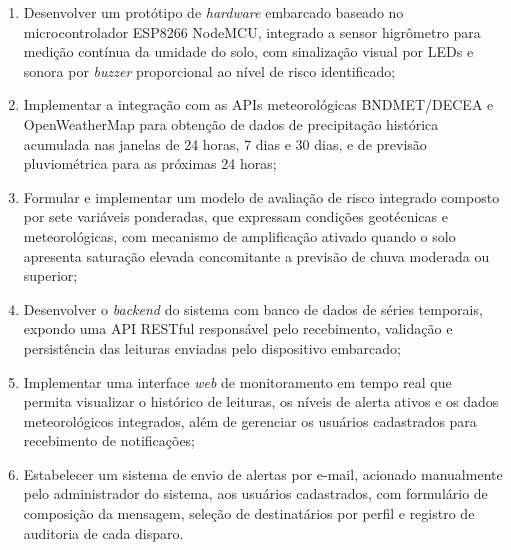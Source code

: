 \begin{enumerate}[label=\alph*)]

    \item Desenvolver um protótipo de \textit{hardware} embarcado
    baseado no microcontrolador ESP8266 NodeMCU, integrado a sensor
    higrômetro para medição contínua da umidade do solo, com
    sinalização visual por LEDs e sonora por \textit{buzzer}
    proporcional ao nível de risco identificado;

    \item Implementar a integração com as APIs meteorológicas
    BNDMET/DECEA e OpenWeatherMap para obtenção de dados de
    precipitação histórica acumulada nas janelas de 24 horas, 7 dias
    e 30 dias, e de previsão pluviométrica para as próximas 24 horas;

    \item Formular e implementar um modelo de avaliação de risco
    integrado composto por sete variáveis ponderadas, que expressam
    condições geotécnicas e meteorológicas, com mecanismo de
    amplificação ativado quando o solo apresenta saturação elevada
    concomitante a previsão de chuva moderada ou superior;

    \item Desenvolver o \textit{backend} do sistema com banco de dados
    de séries temporais, expondo uma API RESTful responsável pelo
    recebimento, validação e persistência das leituras enviadas
    pelo dispositivo embarcado;

    \item Implementar uma interface \textit{web} de monitoramento em
    tempo real que permita visualizar o histórico de leituras, os
    níveis de alerta ativos e os dados meteorológicos integrados,
    além de gerenciar os usuários cadastrados para recebimento de
    notificações;

    \item Estabelecer um sistema de envio de alertas por e-mail,
    acionado manualmente pelo administrador do sistema, aos usuários
    cadastrados, com formulário de composição da mensagem, seleção
    de destinatários por perfil e registro de auditoria de cada
    disparo.

\end{enumerate}